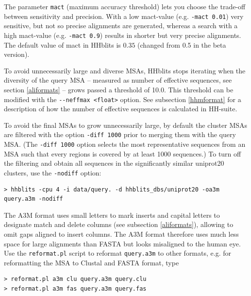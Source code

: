 \documentclass[11pt,a4paper]{article}
\begin{document}
The parameter \verb`mact` (maximum accuracy threshold) lets you choose the trade-off between sensitivity and 
precision. With a low mact-value (e.g. \verb`-mact 0.01`) very sensitive, but not 
so precise alignments are generated, whereas a search with a high mact-value (e.g. \verb`-mact 0.9`) 
results in shorter but very precise alignments. The default value of mact in HHblits is $0.35$ 
(changed from 0.5 in the beta version). 

To avoid unnecessarily large and diverse MSAs, HHblits stops iterating when the diversity of the query MSA -- measured as number of effective sequences, see section \ref{aliformats} -- grows passed a threshold of 10.0. This threshold can be modified with the \verb`--neffmax <float>` option. See subsection \ref{hhmformat} for a description of how the number of effective sequences is calculated in HH-suite.

To avoid the final MSAs to grow unnecessarily large, by default the cluster MSAs are filtered with the option \verb`-diff 1000` prior to merging them with the query MSA. (The \verb`-diff 1000` option selects the most representative sequences from an MSA such that every regions is covered by at least 1000 sequences.) To turn off the filtering and obtain all sequences in the significantly similar uniprot20 clusters, use the \verb`-nodiff` option: 
\begin{verbatim}
> hhblits -cpu 4 -i data/query. -d hhblits_dbs/uniprot20 -oa3m query.a3m -nodiff
\end{verbatim}

The A3M format uses small letters to mark inserts and capital letters to designate match and delete columns (see subsection \ref{aliformats}), allowing to omit gaps aligned to insert columns. The A3M format therefore uses much less space for large alignments than FASTA but looks misaligned to the human eye. Use the \verb`reformat.pl` script to reformat \verb`query.a3m` to other formats, e.g. for reformatting the MSA to Clustal and FASTA format, type

\begin{verbatim}
> reformat.pl a3m clu query.a3m query.clu
> reformat.pl a3m fas query.a3m query.fas
\end{verbatim}
\end{document}
